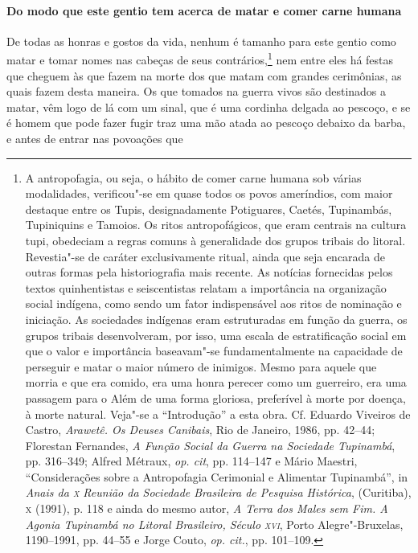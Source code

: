 \begin{linenumbers}
\paragraph{Do modo que este gentio tem acerca de matar e comer carne humana} \quad
De todas as honras e gostos da vida, nenhum é tamanho para
este gentio como matar e tomar nomes nas cabeças de seus 
contrários,\footnote{ A antropofagia, ou seja, o hábito de comer carne humana sob
várias modalidades, verificou"-se em quase todos os povos ameríndios,
com maior destaque entre os Tupis, designadamente Potiguares, Caetés,
Tupinambás, Tupiniquins e Tamoios. Os ritos antropofágicos, que eram
centrais na cultura tupi, obedeciam a regras comuns à generalidade dos
grupos tribais do litoral. Revestia"-se de caráter exclusivamente
ritual, ainda que seja encarada de outras formas pela historiografia
mais recente. As notícias fornecidas pelos textos quinhentistas e
seiscentistas relatam a importância na organização social indígena,
como sendo um fator indispensável aos ritos de nominação e iniciação.
As sociedades indígenas eram estruturadas em função da guerra, os
grupos tribais desenvolveram, por isso, uma escala de estratificação
social em que o valor e importância baseavam"-se fundamentalmente na
capacidade de perseguir e matar o maior número de inimigos. Mesmo para
aquele que morria e que era comido, era uma honra perecer como um
guerreiro, era uma passagem para o Além de uma forma gloriosa,
preferível à morte por doença, à morte natural. Veja"-se a ``Introdução''
a esta obra. Cf. Eduardo Viveiros de Castro, \textit{Arawetê. Os
Deuses Canibais}, Rio de Janeiro, 1986, pp. 42--44; Florestan Fernandes,
\textit{A Função Social da Guerra na Sociedade Tupinambá}, pp. 316--349;
Alfred Métraux, \textit{op. cit}, pp. 114--147 e Mário Maestri, ``Considerações 
sobre a Antropofagia Cerimonial e Alimentar Tupinambá'',
in \textit{Anais da \textsc{x} Reunião da Sociedade Brasileira de Pesquisa
Histórica}, (Curitiba), \textsc{x} (1991), p. 118 e ainda do mesmo autor,
\textit{A Terra dos Males sem Fim. A Agonia Tupinambá no Litoral
Brasileiro, Século \textsc{xvi}}, Porto Alegre"-Bruxelas, 1190--1991, pp. 44--55 e
Jorge Couto, \textit{op. cit.}, pp. 101--109.} nem entre eles há festas
que cheguem às que fazem na morte dos que matam com grandes cerimônias,
as quais fazem desta maneira. Os que tomados na guerra vivos são
destinados a matar, vêm logo de lá com um sinal, que é uma cordinha
delgada ao pescoço, e se é homem que pode fazer fugir traz uma mão
atada ao pescoço debaixo da barba, e antes de entrar nas povoações que

\end{linenumbers}
